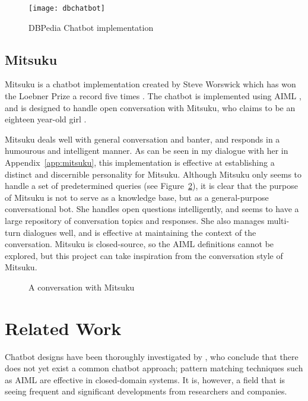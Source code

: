 \begin{figure}[h]
	\centering
	\texttt{[image: dbchatbot]}
	\caption{DBPedia Chatbot implementation \cite{ramngongausbeck2018}}
	\label{fig:dbchatbot}
\end{figure}

\newpage
\subsection{Mitsuku}
\label{subsec:Mitsuku}
Mitsuku is a chatbot implementation created by Steve Worswick \cite{worswick2018mitsuku} which has won the Loebner Prize a record five times \cite{aisb2019}. The chatbot is implemented using AIML \cite{higashinaka2014towards}, and is designed to handle open conversation with Mitsuku, who claims to be an eighteen year-old girl \cite{abdul2015survey}.

Mitsuku deals well with general conversation and banter, and responds in a humourous and intelligent manner. As can be seen in my dialogue with her in Appendix~\ref{app:mitsuku}, this implementation is effective at establishing a distinct and discernible personality for Mitsuku. Although Mitsuku only seems to handle a set of predetermined queries (see Figure~\ref{fig:mitsuku}), it is clear that the purpose of Mitsuku is not to serve as a knowledge base, but as a general-purpose conversational bot. She handles open questions intelligently, and seems to have a large repository of conversation topics and responses. She also manages multi-turn dialogues well, and is effective at maintaining the context of the conversation. Mitsuku is closed-source, so the AIML definitions cannot be explored, but this project can take inspiration from the conversation style of Mitsuku.

\begin{figure}[h]
	\centering
	\qquad
	\caption{A conversation with Mitsuku}
	\label{fig:mitsuku}
\end{figure}


\newpage
\section{Related Work}
Chatbot designs have been thoroughly investigated by \citet{abdul2015survey}, who conclude that there does not yet exist a common chatbot approach; pattern matching techniques such as AIML are effective in closed-domain systems. It is, however, a field that is seeing frequent and significant developments from researchers and companies.

